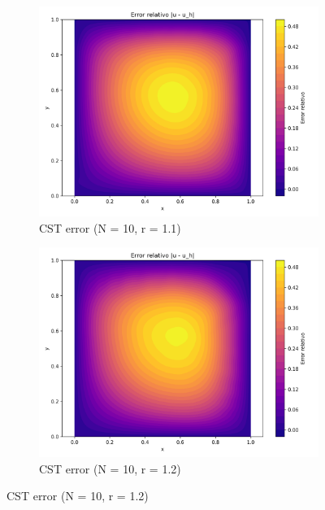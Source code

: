 \documentclass[12pt]{article}
\begin{document}
\begin{figure}[H]
    \centering
    \begin{subfigure}[t]{0.32\textwidth}
        \centering
        \includegraphics[width=\textwidth]{Graficos/11/CST_relative_error_colormap.png}
        \caption{CST error (N = 10, r = 1.1)}
        \label{fig:cst_error_r1.1}
    \end{subfigure}
    \hfill
    \begin{subfigure}[t]{0.32\textwidth}
        \centering
        \includegraphics[width=\textwidth]{Graficos/12/CST_relative_error_colormap.png}
        \caption{CST error (N = 10, r = 1.2)}
        \label{fig:cst_error_r1.2}
    \end{subfigure}

\end{figure}
\end{document}

